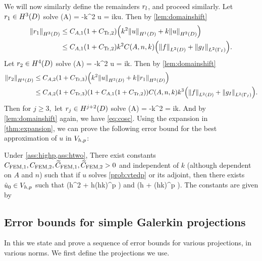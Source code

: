 We will now similarly define the remainders $r_{l}$, and proceed similarly.
Let $\ro \in \HthD$ solve
\beqs
\grad \cdot \mleft(A\grad \ro\mright) = -k^2 u
\eeqs
\beqs
\dn \ro = iku.
\eeqs
Then by \cref{lem:domainshift}
\begin{align*}
\NHthD{\ro} &\leq \CAo\mleft(1+\CTrt\mright)\mleft(k^2\NHoD{u} + k\NHtD{u}\mright)\\
&\leq \CAo\mleft(1+\CTrt\mright)k^2\CAnk\mleft(\NLtD{f} + \NLtGI{\gI}\mright).
\end{align*}
Let $\rt \in \HfD$ solve
\beqs
\grad \cdot \mleft(A\grad \rt\mright) = -k^2 u
\eeqs
\beqs
\dn \rt = ik\ro.
\eeqs
Then by \cref{lem:domainshift}
\begin{align*}
\NHfD{\rt} &\leq \CAt\mleft(1+\CTrth\mright)\mleft(k^2\NHtD{u} + k\NHthD{\ro}\mright)\\
&\leq \CAt\mleft(1+\CTrth\mright)\mleft(1 + \CAo\mleft(1+\CTrt\mright)\mright)\CAnk k^3\mleft(\NLtD{f} + \NLtGI{\gI}\mright).
\end{align*}
Then for $j \geq 3,$ let $\rj \in \HjptD$ solve
\beqs
\grad \cdot \mleft(A\grad \rt\mright) = -k^2 \rjmt
\eeqs
\beqs
\dn \rj = ik\rjmo.
\eeqs
And by \cref{lem:domainshift} again, we have \eqref{eq:cosc}.
\epf
{}
Using the expansion in \cref{thm:expansion}, we can prove the following error bound for the best approximation of $u$ in $V_{h,p}$:

\label{lem:bestapprox}
Under \cref{ass:highp,ass:htwo}, There exist constants $C_{\mathrm{FEM},1}, C_{\mathrm{FEM},2}, \widetilde{C}_{\mathrm{FEM},1}, \widetilde{C}_{\mathrm{FEM},2} > 0$ and independent of $k$ (although dependent on $A$ and $n$) such that if $u$ solves \cref{prob:vtedp} or its adjoint, then there exists $\hat{u}_{0} \in V_{h,p}$ such that
\beqs
{} \leq \mleft(\CFEMo h^2 + \CFEMt \CAnk h\mleft(hk\mright)^p \mright)\Cfg
\eeqs
and
\beqs
{} \leq \mleft(\CFEMotilde h + \CFEMttilde \CAnk \mleft(hk\mright)^p \mright)\Cfg.
\eeqs
The constants are given by
\ele

\epf

\subsection{Error bounds for simple Galerkin projections}\label{sec:errgalerkin}
In this  we state and prove a sequence of error bounds for various projections, in various norms. We first define the projections we use.

